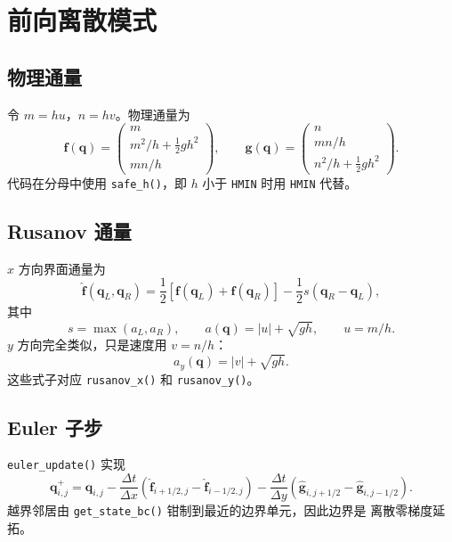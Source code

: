 \documentclass[12pt,a4paper]{article}
\begin{document}
\section{前向离散模式}

\subsection{物理通量}

令 $m=hu$，$n=hv$。物理通量为
\begin{equation}
\mathbf{f}(\mathbf{q}) =
\begin{pmatrix}
m\\
m^2/h+\frac12 g h^2\\
mn/h
\end{pmatrix},
\qquad
\mathbf{g}(\mathbf{q}) =
\begin{pmatrix}
n\\
mn/h\\
n^2/h+\frac12 g h^2
\end{pmatrix}.
\label{eq:physical-flux}
\end{equation}
代码在分母中使用 \texttt{safe\_h()}，即 $h$ 小于 \texttt{HMIN} 时用
\texttt{HMIN} 代替。

\subsection{Rusanov 通量}

$x$ 方向界面通量为
\begin{equation}
\widehat{\mathbf{f}}(\mathbf{q}_L,\mathbf{q}_R)
=
\frac12\left[\mathbf{f}(\mathbf{q}_L)+\mathbf{f}(\mathbf{q}_R)\right]
-\frac12 s(\mathbf{q}_R-\mathbf{q}_L),
\label{eq:rusanov-x}
\end{equation}
其中
\[
s=\max(a_L,a_R),
\qquad
a(\mathbf{q})=|u|+\sqrt{g h},
\qquad
u=m/h.
\]
$y$ 方向完全类似，只是速度用 $v=n/h$：
\[
a_y(\mathbf{q})=|v|+\sqrt{g h}.
\]
这些式子对应 \texttt{rusanov\_x()} 和 \texttt{rusanov\_y()}。

\subsection{Euler 子步}

\texttt{euler\_update()} 实现
\begin{equation}
\mathbf{q}_{i,j}^{+}
=
\mathbf{q}_{i,j}
-\frac{\Delta t}{\Delta x}
\left(
\widehat{\mathbf{f}}_{i+1/2,j}
-\widehat{\mathbf{f}}_{i-1/2,j}
\right)
-\frac{\Delta t}{\Delta y}
\left(
\widehat{\mathbf{g}}_{i,j+1/2}
-\widehat{\mathbf{g}}_{i,j-1/2}
\right).
\label{eq:euler}
\end{equation}
越界邻居由 \texttt{get\_state\_bc()} 钳制到最近的边界单元，因此边界是
离散零梯度延拓。
\end{document}
